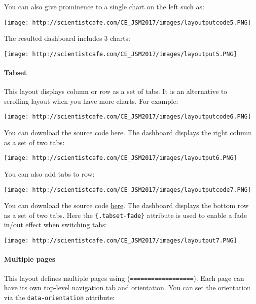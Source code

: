\documentclass[
]{article}
\begin{document}
You can also give prominence to a single chart on the left such as:

\texttt{[image: http://scientistcafe.com/CE\_JSM2017/images/layoutputcode5.PNG]}

The resulted dashboard includes 3 charts:

\texttt{[image: http://scientistcafe.com/CE\_JSM2017/images/layoutput5.PNG]}

\hypertarget{tabset}{%
\paragraph{Tabset}\label{tabset}}

This layout displays column or row as a set of tabs. It is an
alternative to scrolling layout when you have more charts. For example:

\texttt{[image: http://scientistcafe.com/CE\_JSM2017/images/layoutputcode6.PNG]}

You can download the source code
\href{https://raw.githubusercontent.com/happyrabbit/linhui.org/gh-pages/CE_JSM2017/Examples/TabsetCol.Rmd}{here}.
The dashboard displays the right column as a set of two tabs:

\texttt{[image: http://scientistcafe.com/CE\_JSM2017/images/layoutput6.PNG]}

You can also add tabs to row:

\texttt{[image: http://scientistcafe.com/CE\_JSM2017/images/layoutputcode7.PNG]}

You can download the source code
\href{https://raw.githubusercontent.com/happyrabbit/linhui.org/gh-pages/CE_JSM2017/Examples/TabsetRow.Rmd}{here}.
The dashboard displays the bottom row as a set of two tabs. Here the
\texttt{\{.tabset-fade\}} attribute is used to enable a fade in/out
effect when switching tabs:

\texttt{[image: http://scientistcafe.com/CE\_JSM2017/images/layoutput7.PNG]}

\hypertarget{multiple-pages}{%
\paragraph{Multiple pages}\label{multiple-pages}}

This layout defines multiple pages using (\texttt{==================}).
Each page can have its own top-level navigation tab and orientation. You
can set the orientation via the \texttt{data-orientation} attribute:
\end{document}
